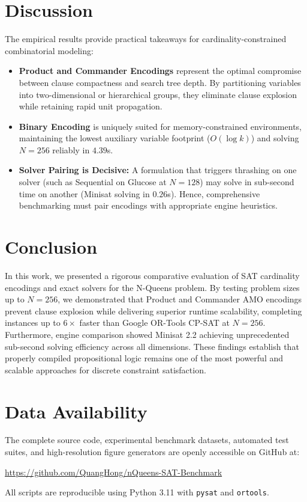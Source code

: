 \documentclass[a4paper,fleqn]{cas-sc}
\begin{document}
\section{Discussion}
The empirical results provide practical takeaways for cardinality-constrained combinatorial modeling:
\begin{itemize}
    \item \textbf{Product and Commander Encodings} represent the optimal compromise between clause compactness and search tree depth. By partitioning variables into two-dimensional or hierarchical groups, they eliminate clause explosion while retaining rapid unit propagation.
    \item \textbf{Binary Encoding} is uniquely suited for memory-constrained environments, maintaining the lowest auxiliary variable footprint ($O(\log k)$) and solving $N = 256$ reliably in $4.39$s.
    \item \textbf{Solver Pairing is Decisive:} A formulation that triggers thrashing on one solver (such as Sequential on Glucose at $N = 128$) may solve in sub-second time on another (Minisat solving in $0.26$s). Hence, comprehensive benchmarking must pair encodings with appropriate engine heuristics.
\end{itemize}

\section{Conclusion}
In this work, we presented a rigorous comparative evaluation of SAT cardinality encodings and exact solvers for the N-Queens problem. By testing problem sizes up to $N = 256$, we demonstrated that Product and Commander AMO encodings prevent clause explosion while delivering superior runtime scalability, completing instances up to $6\times$ faster than Google OR-Tools CP-SAT at $N = 256$. Furthermore, engine comparison showed Minisat 2.2 achieving unprecedented sub-second solving efficiency across all dimensions. These findings establish that properly compiled propositional logic remains one of the most powerful and scalable approaches for discrete constraint satisfaction.

\section*{Data Availability}
The complete source code, experimental benchmark datasets, automated test suites, and high-resolution figure generators are openly accessible on GitHub at:
\begin{center}
\url{https://github.com/QuangHong/nQueens-SAT-Benchmark}
\end{center}
All scripts are reproducible using Python 3.11 with \texttt{pysat} and \texttt{ortools}.



\end{document}
